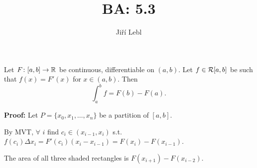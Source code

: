 \documentclass[10pt,aspectratio=149]{beamer}
\author{Ji\v{r}\'i Lebl}
\institute[OSU]{%
Departemento pri Matematiko de Oklahoma {\^S}tata Universitato}
\title{BA: 5.3}
\date{}
\begin{document}
\begin{frame}
\titlepage
\end{frame}

\begin{frame}
\begin{theorem}
Let $F \colon [a,b] \to {\mathbb{R}}$ be continuous, differentiable
on $(a,b)$.
\pause
Let $f \in {\mathcal{R}}[a,b]$ be such that $f(x) = F'(x)$ for $x \in
(a,b)$.
\pause
Then
\vspace*{-12pt}
\begin{equation*}
\int_a^b f = F(b)-F(a) .
\end{equation*}
\end{theorem}

\pause
\textbf{Proof:}
Let $P = \{ x_0, x_1, \ldots, x_n \}$ be a partition of $[a,b]$.

\pause
By MVT, $\forall$ $i$ find
$c_i \in (x_{i-1},x_i)$ s.t.
~$f(c_i) \Delta x_i = F'(c_i) (x_i - x_{i-1}) = F(x_i) - F(x_{i-1})$.

\pause
\medskip

\begin{center}
\end{center}

\pause
The area of all
three shaded rectangles is $F(x_{i+1})-F(x_{i-2})$.

\end{frame}
\end{document}
